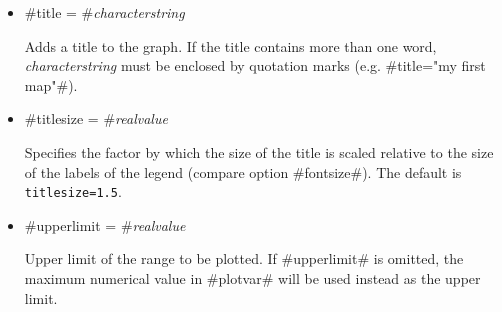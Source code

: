 \begin{itemize}
\item #title = #{\em characterstring}

Adds a title to the graph. If the title contains more than one
word, {\em characterstring} must be enclosed by quotation marks
(e.g. #title="my first map"#).

\item #titlesize = #{\em realvalue}

Specifies the factor by which the size of the title is scaled
relative to the size of the labels of the legend (compare option
#fontsize#). The default is \texttt{titlesize=1.5}.

\item #upperlimit = #{\em realvalue}

Upper limit of the range to be plotted. If #upperlimit# is
omitted, the maximum numerical value in #plotvar# will be used
instead as the upper limit.

\end{itemize}

\newpage

